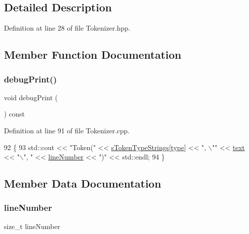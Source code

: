 \subsection{Detailed Description}


Definition at line 28 of file Tokenizer.\+hpp.



\subsection{Member Function Documentation}
\mbox{\label{classft_1_1_token_ad5cb0ada03653eb2e1c8947f05c07ad6}} 
\subsubsection{\texorpdfstring{debug\+Print()}{debugPrint()}}
{\footnotesize\ttfamily void debug\+Print (\begin{DoxyParamCaption}{ }\end{DoxyParamCaption}) const}



Definition at line 91 of file Tokenizer.\+cpp.


\begin{DoxyCode}
92     \{
93         std::cout << \textcolor{stringliteral}{"Token("} << \hyperlink{namespaceft_a1b9b00bc284da71346729142b8560e03}{sTokenTypeStrings}[\hyperlink{classft_1_1_token_a9ba17ef6e6c544012e04da10a6d461e5}{type}] << \textcolor{stringliteral}{", \(\backslash\)""} << 
      \hyperlink{classft_1_1_token_a23c058547fbc73b5659191844a9f258c}{text} << \textcolor{stringliteral}{"\(\backslash\)", "} << \hyperlink{classft_1_1_token_a996a051ecda6b841e4b58246536a7006}{lineNumber} << \textcolor{stringliteral}{")"} << std::endl;
94     \}
\end{DoxyCode}


\subsection{Member Data Documentation}
\mbox{\label{classft_1_1_token_a996a051ecda6b841e4b58246536a7006}} 
\subsubsection{\texorpdfstring{line\+Number}{lineNumber}}
{\footnotesize\ttfamily size\+\_\+t line\+Number}



